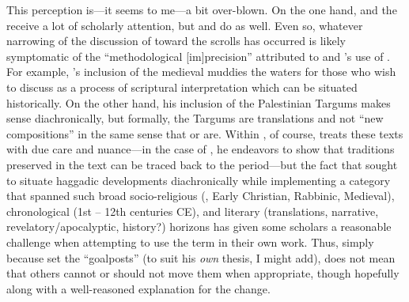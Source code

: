 This perception is---it seems to me---a bit over-blown. On the one hand, \ga and the \templescroll receive a lot of scholarly attention, but \jub and \ant do as well. Even so, whatever narrowing of the discussion of \rwb toward the \qumran scrolls has occurred is likely symptomatic of the ``methodological {[}im{]}precision'' attributed to  and \vermes's use of \rwB. For example, \vermes's inclusion of the medieval \sefer muddies the waters for those who wish to discuss \rwb as a process of scriptural interpretation which can be situated historically. On the other hand, his inclusion of the Palestinian Targums makes sense diachronically, but formally, the Targums are translations and not ``new compositions'' in the same sense that \jub or \ga are. Within , of course, \vermes treats these texts with due care and nuance---in the case of \sefer, he endeavors to show that traditions preserved in the text can be traced back to the \secondtemple period---but the fact that \vermes sought to situate haggadic developments diachronically while implementing a category that spanned such broad socio-religious (\qumran, Early Christian, Rabbinic, Medieval), chronological (1st -- 12th centuries CE), and literary (translations, narrative, revelatory/apocalyptic, history?) horizons has given some scholars a reasonable challenge when attempting to use the term in their own work. Thus, simply because \vermes set the ``goalposts'' (to suit his \emph{own} thesis, I might add), does not mean that others cannot or should not move them when appropriate, though hopefully along with a well-reasoned explanation for the change. 
